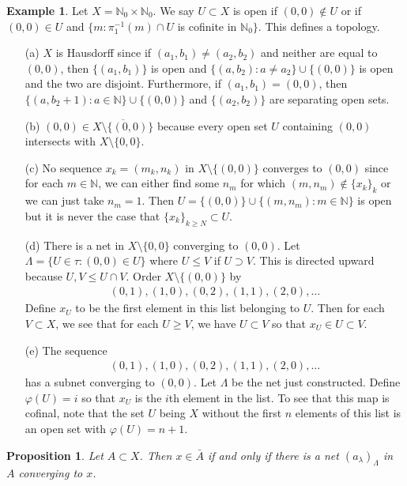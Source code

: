 \documentclass[11pt]{amsart}
\newtheorem{proposition}[theorem]{Proposition}
\theoremstyle{definition}
\newtheorem{example}[theorem]{Example}
\numberwithin{equation}{section}
\begin{document}
\begin{example}
    Let $X=\mathbb N_0\times\mathbb N_0$. We say $U\subset X$ is open if $(0,0)\not\in U$ or if $(0,0)\in U$ and $\{m:\pi_1^{-1}(m)\cap U$ is cofinite in $\mathbb N_0\}$. This defines a topology.
    \begin{enumerate}
        \item [(a)] $X$ is Hausdorff since if $(a_1,b_1)\ne (a_2,b_2)$ and neither are equal to $(0,0)$, then $\{(a_1,b_1)\}$ is open and $\{(a,b_2):a\ne a_2\}\cup\{(0,0)\}$ is open and the two are disjoint. Furthermore, if $(a_1,b_1)=(0,0)$, then $\{(a,b_2+1):a\in\mathbb N\}\cup \{(0,0)\}$ and $\{(a_2,b_2)\}$ are separating open sets.   
        \item [(b)] $(0,0)\in\overline{X\setminus\{(0,0)\}}$ because every open set $U$ containing $(0,0)$ intersects with $X\setminus\{0,0\}$.
        \item [(c)] No sequence $x_k=(m_k,n_k)$ in $X\setminus \{(0,0)\}$ converges to $(0,0)$ since for each $m\in\mathbb N$, we can either find some $n_m$ for which $(m,n_m)\not\in\{x_k\}_k$ or we can just take $n_m=1$. Then $U=\{(0,0)\}\cup\{(m,n_m):m\in\mathbb N\}$ is open but it is never the case that $\{x_k\}_{k\ge N}\subset U$.
        \item [(d)] There is a net in $X\setminus\{0,0\}$ converging to $(0,0)$. Let $\Lambda=\{U\in\tau:(0,0)\in U\}$ where $U\le V$ if $U\supset V$. This is directed upward because $U,V\le U\cap V$. Order $X\setminus\{(0,0)\}$ by 
        \begin{align*}
            (0,1),(1,0),(0,2),(1,1),(2,0),\ldots
        \end{align*}
        Define $x_U$ to be the first element in this list belonging to $U$. Then for each $V\subset X$, we see that for each $U\ge V$, we have $U\subset V$ so that $x_U\in U\subset V$.
        \item [(e)] The sequence
        \begin{align*}
            (0,1),(1,0),(0,2),(1,1),(2,0),\ldots
        \end{align*}
        has a subnet converging to $(0,0)$. Let $\Lambda$ be the net just constructed. Define $\varphi(U)=i$ so that $x_U$ is the $i$th element in the list. To see that this map is cofinal, note that the set $U$ being $X$ without the first $n$ elements of this list is an open set with $\varphi(U)=n+1$.
    \end{enumerate}
\end{example}
\begin{proposition}
    Let $A\subset X$. Then $x\in\bar A$ if and only if there is a net $(a_\lambda)_\Lambda$ in $A$ converging to $x$.
\end{proposition}
\end{document}
